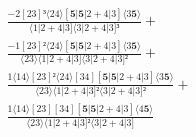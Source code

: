 \documentclass[varwidth, border=5pt]{standalone}
\begin{document}
\begin{my}
$\begin{gathered}
\scriptscriptstyle\frac{-2[23]³⟨24⟩[𝟓|𝟓|2+4|3]⟨3𝟓⟩}{⟨1|2+4|3]⟨3|2+4|3]³} +\\
\scriptscriptstyle\frac{-1[23]²⟨24⟩[𝟓|𝟓|2+4|3]⟨3𝟓⟩}{⟨23⟩⟨1|2+4|3]⟨3|2+4|3]²} +\\
\scriptscriptstyle\frac{1⟨14⟩[23]²⟨24⟩[34][𝟓|𝟓|2+4|3]⟨3𝟓⟩}{⟨23⟩⟨1|2+4|3]²⟨3|2+4|3]²} +\\
\scriptscriptstyle\frac{1⟨14⟩[23][34][𝟓|𝟓|2+4|3]⟨4𝟓⟩}{⟨23⟩⟨1|2+4|3]²⟨3|2+4|3]} \phantom{+}
\end{gathered}$
\end{my}
\end{document}
